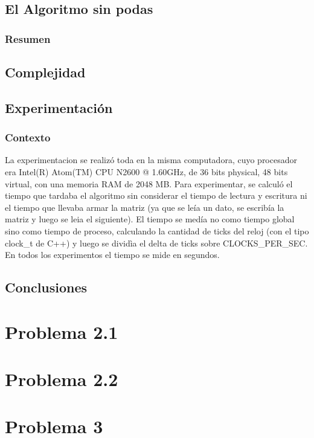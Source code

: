 \documentclass[A4paper,oneside,fleqn,10pt]{article}
\theoremstyle{definition}
\begin{document}
\subsection{El Algoritmo sin podas}

\subsubsection{Resumen}
\subsection{Complejidad}

\subsection{Experimentación}
\subsubsection{Contexto}

La experimentacion se realizó toda en la misma computadora, cuyo procesador era Intel(R) Atom(TM) CPU N2600 @ 1.60GHz, de 36 bits physical, 48 bits virtual, con una memoria RAM de 2048 MB.  Para experimentar, se calculó el tiempo que tardaba el algoritmo sin considerar el tiempo de lectura y escritura ni el tiempo que llevaba armar la matriz (ya que se leía un dato, se escribía la matriz y luego se leia el siguiente). El tiempo se medía no como tiempo global sino como tiempo de proceso, calculando la cantidad de ticks del reloj (con el tipo clock\_t de C++) y luego se dividìa el delta de ticks sobre CLOCKS\_PER\_SEC. En todos los experimentos el tiempo se mide en segundos. 

\subsection{Conclusiones}


\section{Problema 2.1}
\section{Problema 2.2}
\section{Problema 3}
\end{document}

